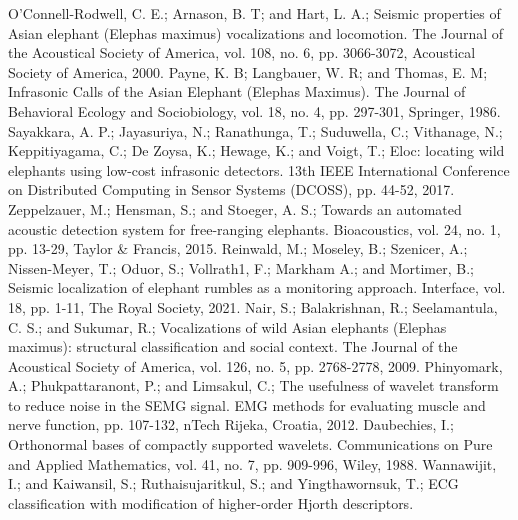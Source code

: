 \documentclass[applsci,article,accept,moreauthors,pdftex]{Definitions/mdpi}
\begin{document}
\begin{thebibliography}{999}
	O’Connell-Rodwell, C. E.; Arnason, B. T; and Hart, L. A.; \newblock Seismic properties of Asian elephant (Elephas maximus) vocalizations and locomotion.
	\newblock  The Journal of the Acoustical Society of America, vol. 108, no. 6, pp. 3066-3072, Acoustical Society of America, 2000.
	Payne, K. B; Langbauer, W. R; and Thomas, E. M; \newblock Infrasonic Calls of the Asian Elephant (Elephas Maximus).
	\newblock  The Journal of Behavioral Ecology and Sociobiology, vol. 18, no. 4, pp. 297-301, Springer, 1986.
	Sayakkara, A. P.; Jayasuriya, N.; Ranathunga, T.; Suduwella, C.; Vithanage, N.; Keppitiyagama, C.; De Zoysa, K.; Hewage, K.; and Voigt, T.; \newblock Eloc: locating wild elephants using low-cost infrasonic detectors.
	\newblock 13th IEEE International Conference on Distributed Computing in Sensor Systems (DCOSS), pp. 44-52, 2017.
	Zeppelzauer, M.; Hensman, S.; and Stoeger, A. S.; \newblock Towards an automated acoustic detection system for free-ranging elephants.
	\newblock Bioacoustics, vol. 24, no. 1, pp. 13-29, Taylor \& Francis, 2015.
	Reinwald, M.; Moseley, B.; Szenicer, A.; Nissen-Meyer, T.; Oduor, S.; Vollrath1, F.; Markham A.; and Mortimer, B.; \newblock Seismic localization of elephant rumbles as a monitoring approach.
	\newblock Interface, vol. 18, pp. 1-11, The Royal Society, 2021.
	Nair, S.; Balakrishnan, R.; Seelamantula, C. S.; and Sukumar, R.; \newblock Vocalizations of wild Asian elephants (Elephas maximus): structural classification and social context.
	\newblock The Journal of the Acoustical Society of America, vol. 126, no. 5, pp. 2768-2778, 2009.
	Phinyomark, A.; Phukpattaranont, P.; and Limsakul, C.; \newblock The usefulness of wavelet transform to reduce noise in the SEMG signal.
	\newblock EMG methods for evaluating muscle and nerve function, pp. 107-132, nTech Rijeka, Croatia, 2012.
	Daubechies, I.; \newblock Orthonormal bases of compactly supported wavelets.
	\newblock Communications on Pure and Applied Mathematics, vol. 41, no. 7, pp. 909-996, Wiley, 1988.
	Wannawijit, I.; and Kaiwansil, S.; Ruthaisujaritkul, S.; and Yingthawornsuk, T.; \newblock ECG classification with modification of higher-order Hjorth descriptors.

\end{thebibliography}
\end{document}
